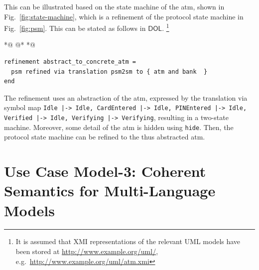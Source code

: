 \documentclass[10pt,fleqn,final]{scrreprt}
\newcommand*{\syntax}[1]{\texttt{#1}}
\newcommand*{\DOL}{\ensuremath{\mathsf{DOL}}\xspace}
\newenvironment{definitions}[0]{\medskip }{}
\newcommand{\uml}[1]{\textsf{#1}}
\providecommand{\DIFaddbegin}{} %
\providecommand{\DIFdelbegin}{} %
\providecommand{\DIFdelend}{} %
\begin{document}
\begin{definitions}
 This can be illustrated based on the state
machine of the \uml{atm}, shown in Fig.~\ref{fig:state-machine}, which is a  
refinement of the protocol state machine in Fig.~\ref{fig:psm}. This can be stated as follows in \DOL. 
\footnote{  It is assumed that XMI representations of the relevant UML models have been 
stored at \url{http://www.example.org/uml/},
e.g.\ \url{http://www.example.org/uml/atm.xmi} } 


 *@ \DIFdelbegin %
\DIFdelend @*   *@ \DIFaddbegin \begin{lstlisting}[basicstyle=\ttfamily,language=dolText,escapechar=@,mathescape]
refinement abstract_to_concrete_atm =
  psm refined via translation psm2sm to { atm and bank  }
end
\end{lstlisting}

The refinement uses an abstraction of the \uml{atm}, expressed by the
translation via symbol map \texttt{Idle |-> Idle, CardEntered |-> Idle, PINEntered |-> Idle, Verified |-> Idle, Verifying |-> Verifying}, resulting in a two-state machine. Moreover, some detail of the \uml{atm} is hidden using
\syntax{hide}. Then, the protocol state machine can be refined to
the thus abstracted \uml{atm}.

\section{Use Case Model-3: Coherent Semantics for Multi-Language Models}
\label{model-3}


\end{definitions}
\end{document}
